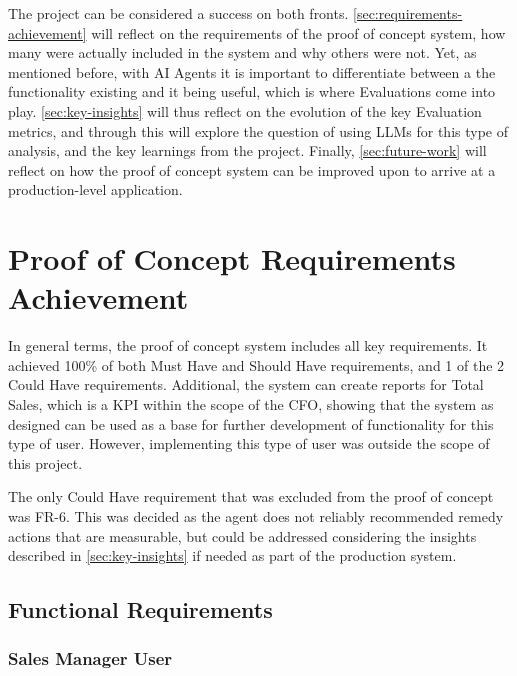 \documentclass[a4paper]{report}
\begin{document}
The project can be considered a success on both fronts. \autoref{sec:requirements-achievement} will reflect on the requirements of the proof of concept system, how many were actually included in the system and why others were not. Yet, as mentioned before, with AI Agents it is important to differentiate between a the functionality existing and it being useful, which is where Evaluations come into play. \autoref{sec:key-insights} will thus reflect on the evolution of the key Evaluation metrics, and through this will explore the question of using LLMs for this type of analysis, and the key learnings from the project. Finally, \autoref{sec:future-work} will reflect on how the proof of concept system can be improved upon to arrive at a production-level application.

\section{Proof of Concept Requirements Achievement}
\label{sec:requirements-achievement}

In general terms, the proof of concept system includes all key requirements. It achieved 100\% of both Must Have and Should Have requirements, and 1 of the 2 Could Have requirements. Additional, the system can create reports for Total Sales, which is a KPI within the scope of the CFO, showing that the system as designed can be used as a base for further development of functionality for this type of user. However, implementing this type of user was outside the scope of this project.

The only Could Have requirement that was excluded from the proof of concept was FR-6. This was decided as the agent does not reliably recommended remedy actions that are measurable, but could be addressed considering the insights described in \autoref{sec:key-insights} if needed as part of the production system.


\newcommand{\rfrid}{FR-\arabic{ref-frcounter}}
\newcommand{\rnfrid}{NFR-\arabic{ref-nfrcounter}}

\subsection{Functional Requirements}

\subsubsection{Sales Manager User}
\end{document}
